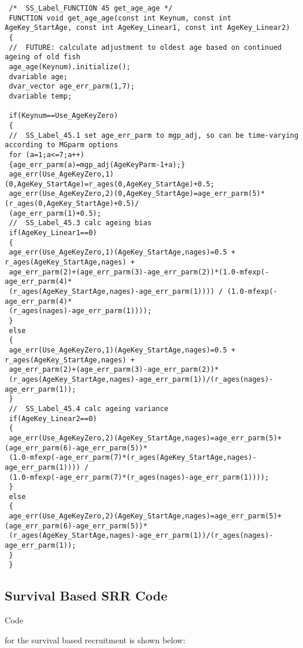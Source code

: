 \scriptsize
\begin{verbatim}
 /*  SS_Label_FUNCTION 45 get_age_age */
 FUNCTION void get_age_age(const int Keynum, const int AgeKey_StartAge, const int AgeKey_Linear1, const int AgeKey_Linear2)
 {
 //  FUTURE: calculate adjustment to oldest age based on continued ageing of old fish
 age_age(Keynum).initialize();
 dvariable age;
 dvar_vector age_err_parm(1,7);
 dvariable temp;
 
 if(Keynum==Use_AgeKeyZero)
 {
 //  SS_Label_45.1 set age_err_parm to mgp_adj, so can be time-varying according to MGparm options
 for (a=1;a<=7;a++)
 {age_err_parm(a)=mgp_adj(AgeKeyParm-1+a);}
 age_err(Use_AgeKeyZero,1)(0,AgeKey_StartAge)=r_ages(0,AgeKey_StartAge)+0.5;
 age_err(Use_AgeKeyZero,2)(0,AgeKey_StartAge)=age_err_parm(5)*(r_ages(0,AgeKey_StartAge)+0.5)/
 (age_err_parm(1)+0.5);
 //  SS_Label_45.3 calc ageing bias
 if(AgeKey_Linear1==0)
 {
 age_err(Use_AgeKeyZero,1)(AgeKey_StartAge,nages)=0.5 + r_ages(AgeKey_StartAge,nages) + 
 age_err_parm(2)+(age_err_parm(3)-age_err_parm(2))*(1.0-mfexp(-age_err_parm(4)*
 (r_ages(AgeKey_StartAge,nages)-age_err_parm(1)))) / (1.0-mfexp(-age_err_parm(4)*
 (r_ages(nages)-age_err_parm(1))));
 }
 else
 {
 age_err(Use_AgeKeyZero,1)(AgeKey_StartAge,nages)=0.5 + r_ages(AgeKey_StartAge,nages) + 
 age_err_parm(2)+(age_err_parm(3)-age_err_parm(2))*
 (r_ages(AgeKey_StartAge,nages)-age_err_parm(1))/(r_ages(nages)-age_err_parm(1));
 }
 //  SS_Label_45.4 calc ageing variance
 if(AgeKey_Linear2==0)
 {
 age_err(Use_AgeKeyZero,2)(AgeKey_StartAge,nages)=age_err_parm(5)+(age_err_parm(6)-age_err_parm(5))*
 (1.0-mfexp(-age_err_parm(7)*(r_ages(AgeKey_StartAge,nages)-age_err_parm(1)))) / 
 (1.0-mfexp(-age_err_parm(7)*(r_ages(nages)-age_err_parm(1))));
 }
 else
 {
 age_err(Use_AgeKeyZero,2)(AgeKey_StartAge,nages)=age_err_parm(5)+(age_err_parm(6)-age_err_parm(5))*
 (r_ages(AgeKey_StartAge,nages)-age_err_parm(1))/(r_ages(nages)-age_err_parm(1));
 }
 }
\end{verbatim}


\subsection{Survival Based SRR Code}
\hypertarget{AppendixC}{Code} for the survival based recruitment is shown below:\\

